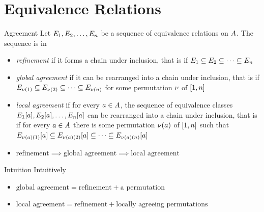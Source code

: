 \documentclass{beamer}
\begin{document}
\section{Equivalence Relations}
\begin{frame}{Agreement}
Let $E_{1},E_{2},\dots,E_{n}$ be a sequence of equivalence relations on
$A$. The sequence is in
\begin{itemize}
  \item
  \emph{refinement} if it forms a chain under
  inclusion,
  that is if $E_{1}\subseteq E_{2}\subseteq\dots\subseteq E_{n}$
  
  \pause
  \item
  \emph{global agreement} if it can be rearranged into
  a chain under inclusion,
  that is if $E_{\nu(1)}\subseteq E_{\nu(2)}\subseteq\dots
  \subseteq E_{\nu(n)}$ for some permutation $\nu$ of $[1,n]$
  
  \pause
  \item
  \emph{local agreement} if for every $a\in A$,
  the sequence of equivalence classes
  $E_{1}[a],E_{2}[a],\dots,E_{n}[a]$ can be rearranged into a
  chain under inclusion, that is if for every $a\in A$ there
  is some permutation $\nu(a)$ of $[1,n]$ such that
  $E_{\nu(a)(1)}[a]\subseteq E_{\nu(a)(2)}[a]\subseteq
  \dots\subseteq E_{\nu(a)(n)}[a]$
  
  \pause
  \item
  $\text{refinement} \implies \text{global agreement} \implies \text{local
  agreement}$
\end{itemize}
\end{frame}

\begin{frame}{Intuition}
Intuitively
\begin{itemize}
  \item 
  $\text{global agreement} = \text{refinement} + \text{a permutation}$
  
  \pause
  \item
  $\text{local agreement} = \text{refinement} + \text{locally agreeing
  permutations}$
\end{itemize}
\end{frame}
\end{document}
